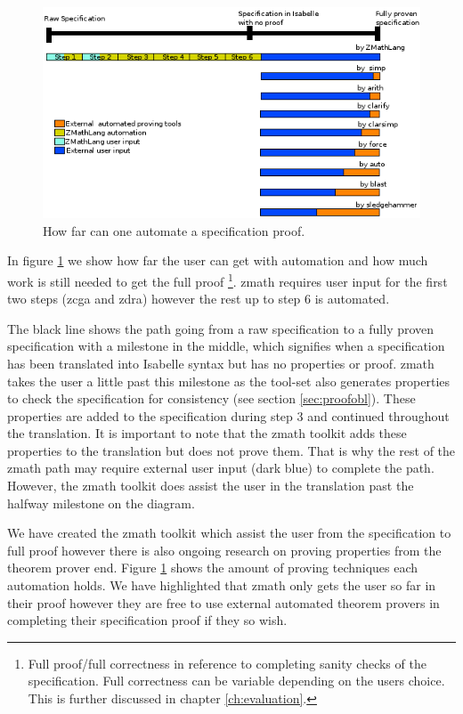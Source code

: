 \begin{figure}[H]
 \begin{center}
 \includegraphics [scale=0.75]{Figures/Design/timeline.png}
 \caption{How far can one automate a specification proof.}
 \label{fig:timeline}
\end{center}
\end{figure} 

In figure \ref{fig:timeline} we show how far the user can get with automation
and how much work is still needed to get the full proof \footnote{Full
proof/full correctness in reference to completing sanity checks of the
specification. Full correctness can be variable depending on the users choice.
This is further discussed in chapter \ref{ch:evaluation}.}. \Gls{zmath} requires
user input for the first two steps (\gls{zcga} and \gls{zdra}) however the rest
up to step 6 is automated.

The black line shows the path going from a raw specification to a fully proven
specification with a milestone in the middle, which signifies when a
specification has been translated into Isabelle syntax but has no properties or
proof. \Gls{zmath} takes the user a little past this milestone as the tool-set
also generates properties to check the specification for consistency (see
section \ref{sec:proofobl}). These properties are added to the specification
during step 3 and continued throughout the translation. It is important to note
that the \gls{zmath} toolkit adds these properties to the translation but does
not prove them. That is why the rest of the \gls{zmath} path may require
external user input (dark blue) to complete the path. However, the \gls{zmath}
toolkit does assist the user in the translation past the halfway milestone on
the diagram.

We have created the \Gls{zmath} toolkit which assist the user from the
specification to full proof however there is also ongoing research on proving
properties from the theorem prover end. Figure \ref{fig:timeline} shows the
amount of proving techniques each automation holds. We have highlighted that
\gls{zmath} only gets the user so far in their proof however they are free to
use external automated theorem provers in completing their specification proof
if they so wish.

